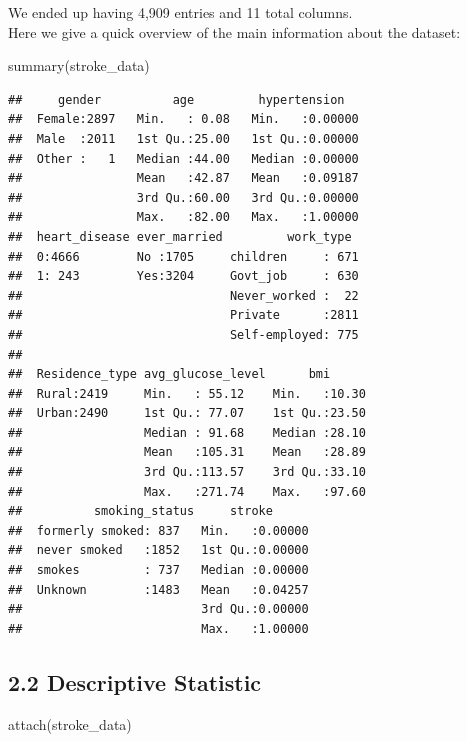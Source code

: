\documentclass[
]{article}
\newenvironment{Shaded}{\begin{snugshade}}{\end{snugshade}}
\newcommand{\FunctionTok}[1]{\textcolor[rgb]{0.00,0.00,0.00}{#1}}
\newcommand{\NormalTok}[1]{#1}
\begin{document}
We ended up having 4,909 entries and 11 total columns.\\
Here we give a quick overview of the main information about the dataset:

\begin{Shaded}
\begin{Highlighting}[]
\FunctionTok{summary}\NormalTok{(stroke\_data)}
\end{Highlighting}
\end{Shaded}

\begin{verbatim}
##     gender          age         hypertension    
##  Female:2897   Min.   : 0.08   Min.   :0.00000  
##  Male  :2011   1st Qu.:25.00   1st Qu.:0.00000  
##  Other :   1   Median :44.00   Median :0.00000  
##                Mean   :42.87   Mean   :0.09187  
##                3rd Qu.:60.00   3rd Qu.:0.00000  
##                Max.   :82.00   Max.   :1.00000  
##  heart_disease ever_married         work_type   
##  0:4666        No :1705     children     : 671  
##  1: 243        Yes:3204     Govt_job     : 630  
##                             Never_worked :  22  
##                             Private      :2811  
##                             Self-employed: 775  
##                                                 
##  Residence_type avg_glucose_level      bmi       
##  Rural:2419     Min.   : 55.12    Min.   :10.30  
##  Urban:2490     1st Qu.: 77.07    1st Qu.:23.50  
##                 Median : 91.68    Median :28.10  
##                 Mean   :105.31    Mean   :28.89  
##                 3rd Qu.:113.57    3rd Qu.:33.10  
##                 Max.   :271.74    Max.   :97.60  
##          smoking_status     stroke       
##  formerly smoked: 837   Min.   :0.00000  
##  never smoked   :1852   1st Qu.:0.00000  
##  smokes         : 737   Median :0.00000  
##  Unknown        :1483   Mean   :0.04257  
##                         3rd Qu.:0.00000  
##                         Max.   :1.00000
\end{verbatim}

\hypertarget{descriptive-statistic}{%
\subsection{2.2 Descriptive Statistic}\label{descriptive-statistic}}

\begin{Shaded}
\begin{Highlighting}[]
\FunctionTok{attach}\NormalTok{(stroke\_data)}
\end{Highlighting}
\end{Shaded}
\end{document}
